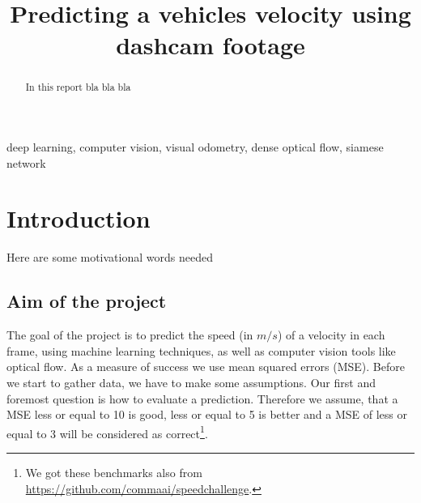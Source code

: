 \documentclass[conference]{IEEEtran}
\begin{document}
\title{Predicting a vehicles velocity using dashcam footage}

\author{
\and
{}
}

\maketitle

\begin{abstract}
In this report bla bla bla
\end{abstract}

\begin{IEEEkeywords}
deep learning, computer vision, visual odometry, dense optical flow, siamese network
\end{IEEEkeywords}

\section{Introduction}
Here are some motivational words needed
\subsection{Aim of the project}
\label{subsec:AimAndMeasure}
The goal of the project is to predict the speed (in $m/s$) of a velocity in each frame, using machine learning 
techniques, as well as computer vision tools like optical flow. As a measure of success we use mean squared errors (MSE).
Before we start to gather data, we have to make some assumptions. Our first and foremost question is how to evaluate a
prediction. Therefore we assume, that a MSE less or equal to 10 is good, less or equal to 5 is better and a MSE of less
or equal to 3 will be considered as correct\footnote{We got these benchmarks also from \url{https://github.com/commaai/speedchallenge}.}.
\end{document}
